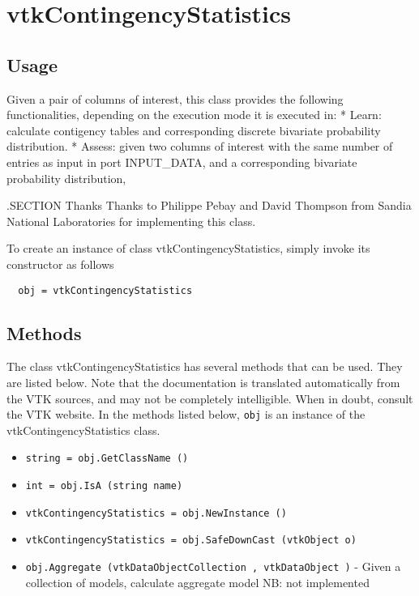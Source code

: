 \section{vtkContingencyStatistics}

\subsection{Usage}

 Given a pair of columns of interest, this class provides the
 following functionalities, depending on the execution mode it is executed in:
 * Learn: calculate contigency tables and corresponding discrete bivariate
   probability distribution. 
 * Assess: given two columns of interest with the same number of entries as
   input in port INPUT\_DATA, and a corresponding bivariate probability distribution,
  
 .SECTION Thanks
 Thanks to Philippe Pebay and David Thompson from Sandia National Laboratories 
 for implementing this class.

To create an instance of class vtkContingencyStatistics, simply
invoke its constructor as follows
\begin{verbatim}
  obj = vtkContingencyStatistics
\end{verbatim}
\subsection{Methods}

The class vtkContingencyStatistics has several methods that can be used.
  They are listed below.
Note that the documentation is translated automatically from the VTK sources,
and may not be completely intelligible.  When in doubt, consult the VTK website.
In the methods listed below, \verb|obj| is an instance of the vtkContingencyStatistics class.
\begin{itemize}
\item  \verb|string = obj.GetClassName ()|

\item  \verb|int = obj.IsA (string name)|

\item  \verb|vtkContingencyStatistics = obj.NewInstance ()|

\item  \verb|vtkContingencyStatistics = obj.SafeDownCast (vtkObject o)|

\item  \verb|obj.Aggregate (vtkDataObjectCollection , vtkDataObject )| -  Given a collection of models, calculate aggregate model
 NB: not implemented

\end{itemize}
